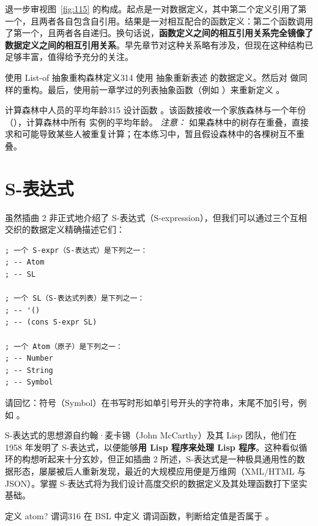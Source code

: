 退一步审视图~\ref{fig:115} 的构成。起点是一对数据定义，其中第二个定义引用了第一个，且两者各自包含自引用。结果是一对相互配合的函数定义：第二个函数调用了第一个，且两者各自递归。换句话说，\textbf{函数定义之间的相互引用关系完全镜像了数据定义之间的相互引用关系}。早先章节对这种关系略有涉及，但现在这种结构已足够丰富，值得给予充分的关注。

\begin{exercise}{使用 List-of 抽象重构森林定义}{314}
使用  抽象重新表述  的数据定义。然后对  做同样的重构。最后，使用前一章学过的列表抽象函数（例如 ）来重新定义 。
\end{exercise}

\begin{exercise}{计算森林中人员的平均年龄}{315}
设计函数 。该函数接收一个家族森林与一个年份（），计算森林中所有  实例的平均年龄。
\emph{注意：} 如果森林中的树存在重叠，直接求和可能导致某些人被重复计算；在本练习中，暂且假设森林中的各棵树互不重叠。
\end{exercise}

\section{S-表达式 }
\label{sec:19.3_sexpr}

虽然插曲 2 非正式地介绍了 S-表达式（S-expression），但我们可以通过三个互相交织的数据定义精确描述它们：

\begin{lstlisting}[language=BSL]
; 一个 S-expr（S-表达式）是下列之一：
; -- Atom
; -- SL

; 一个 SL（S-表达式列表）是下列之一：
; -- '()
; -- (cons S-expr SL)

; 一个 Atom（原子）是下列之一：
; -- Number
; -- String
; -- Symbol
\end{lstlisting}

请回忆：符号（Symbol）在书写时形如单引号开头的字符串，末尾不加引号，例如 。

S-表达式的思想源自约翰·麦卡锡（John McCarthy）及其 Lisp 团队，他们在 1958 年发明了 S-表达式，以便能够\textbf{用 Lisp 程序来处理 Lisp 程序}。这种看似循环的构想听起来十分玄妙，但正如插曲 2 所述，S-表达式是一种极具通用性的数据形态，屡屡被后人重新发现，最近的大规模应用便是万维网（XML/HTML 与 JSON）。掌握 S-表达式将为我们设计高度交织的数据定义及其处理函数打下坚实基础。

\begin{exercise}{定义 atom? 谓词}{316}
在 BSL 中定义  谓词函数，判断给定值是否属于 。
\end{exercise}

